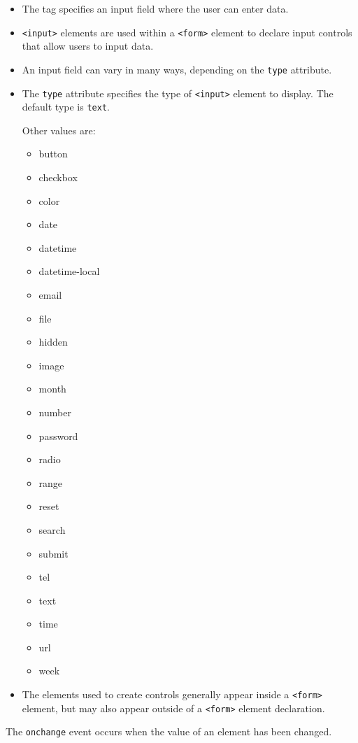 \begin{itemize}
\item
The 
tag specifies an input field where the user can enter data.

\item
\verb|<input>| elements are used within a \verb|<form>| element to declare input controls that allow users to input data.

\item
An input field can vary in many ways, depending on the \verb|type| attribute.

\item
The \verb|type| attribute specifies the type of \verb|<input>| element to display.
The default type is \verb|text|.

Other values are:
\begin{itemize}
\item button
\item checkbox
\item color
\item date 
\item datetime 
\item datetime-local 
\item email 
\item file
\item hidden
\item image
\item month 
\item number 
\item password
\item radio
\item range 
\item reset
\item search
\item submit
\item tel
\item text
\item time 
\item url
\item week
\end{itemize}
\item
The elements used to create controls generally appear inside a \verb|<form>| 
element, but may also appear outside of a \verb|<form>| element declaration.
\end{itemize}

The \verb|onchange| event occurs when the value of an element has been changed.

